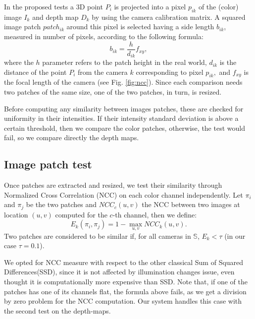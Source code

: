 In the proposed tests a 3D point $P_i$ is projected into a pixel $p_{ik}$ of the (color) image $I_k$ and depth map $D_k$ by using the camera calibration matrix. A squared image patch $patch_{ik}$ around this pixel is selected having a side length $b_{ik}$, measured in number of pixels, according to the following formula:
\begin{equation}
 b_{ik} = \frac{h}{d_{ik}}f_{xy},
\end{equation}
where the $h$ parameter refers to the patch height in the real world, $d_{ik}$ is the distance of the point $P_i$ from the camera $k$ corresponding to pixel $p_{ik},$ and $f_{xy}$ is the focal length of the camera (see Fig. \ref{fig:ncc}).
Since each comparison needs two patches of the same size, one of the two patches, in turn, is resized.

Before computing any similarity between images patches, these are checked for uniformity in their intensities. If their intensity standard deviation is above a certain threshold, then we compare the color patches, otherwise, the test would fail, so we compare directly the depth maps.

\subsection{Image patch test}%
Once patches are extracted and resized, we test their similarity through Normalized Cross Correlation (NCC) on each color channel independently. 
Let $\pi_i$ and $\pi_j$ be the two patches and $NCC_c(u,v)$ the NCC between two images at location $(u,v)$ computed for the $c$-th channel, then we define:
\begin{equation}
 E_k(\pi_i, \pi_j) = 1 - \max_{u,v}NCC_k(u,v).
\end{equation}
Two patches are considered to be similar if, for all cameras in $\mathbb{S}$, $E_k < \tau$ (in our case $\tau=0.1$). 

We opted for NCC measure with respect to the other classical Sum of Squared Differences(SSD), since it is not affected by illumination changes issue, even thought it is computationally more expensive than SSD. Note that, if one of the patches has one of its channels flat, the formula above fails, as we get a division by zero problem for the NCC computation. Our system handles this case with the second test on the depth-maps. 

